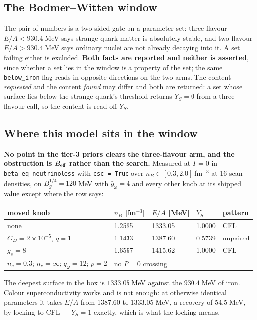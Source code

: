 \documentclass[11pt,a4paper]{article}
\begin{document}
\subsection{The Bodmer--Witten window}

The pair of numbers is a two-sided gate on a parameter set: three-flavour
$E/A < 930.4\;$MeV says strange quark matter is absolutely stable, and
two-flavour $E/A > 930.4\;$MeV says ordinary nuclei are not already decaying
into it. A set failing either is excluded. \textbf{Both facts are reported and
neither is asserted}, since whether a set lies in the window is a property of
the set; the same \texttt{below\_iron} flag reads in opposite directions on the
two arms. The content \emph{requested} and the content \emph{found} may differ
and both are returned: a set whose surface lies below the strange quark's
threshold returns $Y_S = 0$ from a three-flavour call, so the content is read
off $Y_S$.

\subsection{Where this model sits in the window}

\textbf{No point in the tier-3 priors clears the three-flavour arm, and the
obstruction is $B_{\rm eff}$ rather than the search.} Measured at $T = 0$ in
\texttt{beta\_eq\_neutrinoless} with \texttt{csc = True} over
$n_B \in [0.3, 2.0]\;$fm$^{-3}$ at 16 scan densities, on
$B_g^{1/4} = 120\;$MeV with $\bar g_\omega = 4$ and every other knob at its
shipped value except where the row says:

\begin{center}
\begin{tabular}{lllll}
\toprule
moved knob & $n_B$ [fm$^{-3}$] & $E/A$ [MeV] & $Y_S$ & pattern \\
\midrule
none & 1.2585 & 1333.05 & 1.0000 & CFL \\
$G_D = 2\times10^{-5}$, $q = 1$ & 1.1433 & 1387.60 & 0.5739 & unpaired \\
$g_s = 8$ & 1.6567 & 1415.62 & 1.0000 & CFL \\
$n_c = 0.3$; $n_c = \infty$; $\bar g_\omega = 12$; $p = 2$
 & \multicolumn{4}{l}{no $P = 0$ crossing} \\
\bottomrule
\end{tabular}
\end{center}

The deepest surface in the box is $1333.05\;$MeV against the $930.4\;$MeV of
iron. Colour superconductivity works and is not enough: at otherwise identical
parameters it takes $E/A$ from 1387.60 to $1333.05\;$MeV, a recovery of
$54.5\;$MeV, by locking to CFL --- $Y_S = 1$ exactly, which is what the locking
means.
\end{document}
